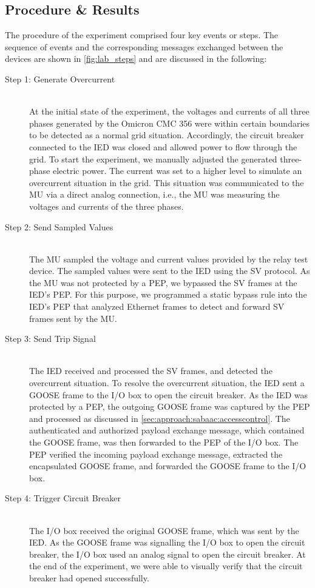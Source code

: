 \subsection{Procedure \& Results}
\label{sec:evaluation:compatibility:procedure}
The procedure of the experiment comprised four key events or steps.
The sequence of events and the corresponding messages exchanged between the devices are shown in \autoref{fig:lab_steps} and are discussed in the following:
\begin{description}
    \item[Step 1: Generate Overcurrent]~\\
    At the initial state of the experiment, the voltages and currents of all three phases generated by the Omicron CMC 356 were within certain boundaries to be detected as a normal grid situation.
    Accordingly, the circuit breaker connected to the IED was closed and allowed power to flow through the grid.
    To start the experiment, we manually adjusted the generated three-phase electric power.
    The current was set to a higher level to simulate an overcurrent situation in the grid.
    This situation was communicated to the MU via a direct analog connection, i.e., the MU was measuring the voltages and currents of the three phases.

    \item[Step 2: Send Sampled Values]~\\
    The MU sampled the voltage and current values provided by the relay test device.
    The sampled values were sent to the IED using the SV protocol.
    As the MU was not protected by a PEP, we bypassed the SV frames at the IED's PEP.
    For this purpose, we programmed a static bypass rule into the IED's PEP that analyzed Ethernet frames to detect and forward SV frames sent by the MU.

    \item[Step 3: Send Trip Signal]~\\
    The IED received and processed the SV frames, and detected the overcurrent situation.
    To resolve the overcurrent situation, the IED sent a GOOSE frame to the I/O box to open the circuit breaker.
    As the IED was protected by a PEP, the outgoing GOOSE frame was captured by the PEP and processed as discussed in \autoref{sec:approach:sabaac:accesscontrol}.
    The authenticated and authorized payload exchange message, which contained the GOOSE frame, was then forwarded to the PEP of the I/O box.
    The PEP verified the incoming payload exchange message, extracted the encapsulated GOOSE frame, and forwarded the GOOSE frame to the I/O box.

    \item[Step 4: Trigger Circuit Breaker]~\\
    The I/O box received the original GOOSE frame, which was sent by the IED.
    As the GOOSE frame was signalling the I/O box to open the circuit breaker, the I/O box used an analog signal to open the circuit breaker.
    At the end of the experiment, we were able to visually verify that the circuit breaker had opened successfully.
\end{description}
